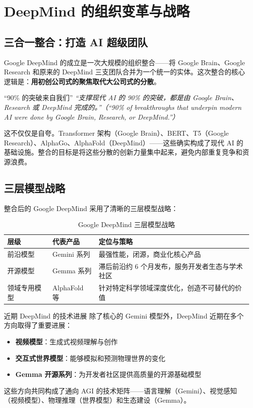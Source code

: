\section{DeepMind 的组织变革与战略}

\subsection{三合一整合：打造 AI 超级团队}

Google DeepMind 的成立是一次大规模的组织整合——将 Google Brain、Google Research 和原来的 DeepMind 三支团队合并为一个统一的实体。这次整合的核心逻辑是：\textbf{用初创公司式的聚焦取代大公司式的分散}。

\begin{importantbox}{``90\% 的突破来自我们''}
\textit{``支撑现代 AI 的 90\% 的突破，都是由 Google Brain、Research 或 DeepMind 完成的。''（``90\% of breakthroughs that underpin modern AI were done by Google Brain, Research, or DeepMind.''）}

这不仅仅是自夸。Transformer 架构（Google Brain）、BERT、T5（Google Research）、AlphaGo、AlphaFold（DeepMind）——这些确实构成了现代 AI 的基础设施。整合的目标是将这些分散的创新力量集中起来，避免内部重复竞争和资源浪费。
\end{importantbox}

\subsection{三层模型战略}

整合后的 Google DeepMind 采用了清晰的三层模型战略：

\begin{table}[H]
\centering
\begin{tabular}{p{} p{} p{}}
\toprule
\textbf{层级} & \textbf{代表产品} & \textbf{定位与策略} \\
\midrule
前沿模型 & Gemini 系列 & 最强性能，闭源，商业化核心产品 \\
开源模型 & Gemma 系列 & 滞后前沿约 6 个月发布，服务开发者生态与学术社区 \\
领域专用模型 & AlphaFold 等 & 针对特定科学领域深度优化，创造不可替代的价值 \\
\bottomrule
\end{tabular}
\caption{Google DeepMind 三层模型战略}
\end{table}

\begin{knowledgebox}{近期 DeepMind 的技术进展}
除了核心的 Gemini 模型外，DeepMind 近期在多个方向取得了重要进展：
\begin{itemize}
    \item \textbf{视频模型}：生成式视频理解与创作
    \item \textbf{交互式世界模型}：能够模拟和预测物理世界的变化
    \item \textbf{Gemma 开源系列}：为开发者社区提供高质量的开源基础模型
\end{itemize}
这些方向共同构成了通向 AGI 的技术矩阵——语言理解（Gemini）、视觉感知（视频模型）、物理推理（世界模型）和生态建设（Gemma）。
\end{knowledgebox}


